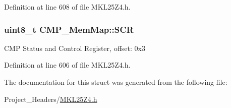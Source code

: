 Definition at line 608 of file M\+K\+L25\+Z4.\+h.

\subsubsection[{\texorpdfstring{S\+CR}{SCR}}]{\setlength{\rightskip}{0pt plus 5cm}uint8\+\_\+t C\+M\+P\+\_\+\+Mem\+Map\+::\+S\+CR}\hypertarget{struct_c_m_p___mem_map_a3fe55f0243869b50fc54acb9c194d970}{}\label{struct_c_m_p___mem_map_a3fe55f0243869b50fc54acb9c194d970}
C\+MP Status and Control Register, offset\+: 0x3 

Definition at line 606 of file M\+K\+L25\+Z4.\+h.



The documentation for this struct was generated from the following file\+:\begin{DoxyCompactItemize}
\item 
Project\+\_\+\+Headers/\hyperlink{_m_k_l25_z4_8h}{M\+K\+L25\+Z4.\+h}\end{DoxyCompactItemize}
